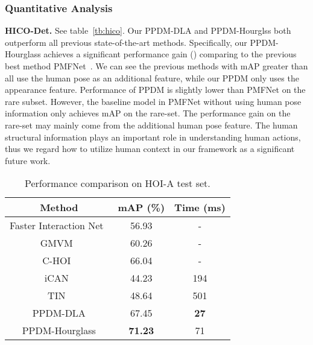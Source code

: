 \documentclass[10pt,twocolumn,letterpaper]{article}
\begin{document}
\subsubsection{Quantitative Analysis}
\vspace{-1.5mm}
\noindent\textbf{HICO-Det.} See table~\ref{tb:hico}. Our PPDM-DLA and PPDM-Hourglss both outperform all previous state-of-the-art methods. Specifically, our PPDM-Hourglass achieves a significant performance gain () comparing to the previous best method PMFNet~\cite{Wan_2019_ICCV}. We can see the previous methods with mAP greater than  all use the human pose as an additional feature, while our PPDM only uses the appearance feature. Performance of PPDM is slightly lower than PMFNet on the rare subset. However, the baseline model in PMFNet without using human pose information only achieves  mAP on the rare-set. The performance gain on the rare-set may mainly come from the additional human pose feature. The human structural information plays an
important role in understanding human actions, thus we regard how to utilize human context in our framework as a significant future work.
\begin{table}[htb!]
  \vspace{-2mm}
  \begin{center}
  \small
  \begin{tabular}{ccc}
    \hline
  Method           &mAP (\%) & Time (ms)\\
  \hline
  Faster Interaction Net~\cite{picleadboard} &56.93&-\\
  GMVM~\cite{picleadboard} &60.26&-\\
  C-HOI~\cite{Zhou_2020_CVPR} &66.04&-\\
  \hline
  iCAN~\cite{gao2018ican} &44.23& 194 \\
  TIN~\cite{li2018transferable} & 48.64 & 501 \\
  \hline
  PPDM-DLA & 67.45 & \textbf{27}\\
  PPDM-Hourglass & \textbf{71.23} & 71\\
  \hline
  \end{tabular}
  \end{center}
  \vspace{-2mm}
  \caption{ Performance comparison on HOI-A test set.}
  \label{tb:hoiw_exp}
\vspace{-2mm}
 \end{table}
\end{document}
